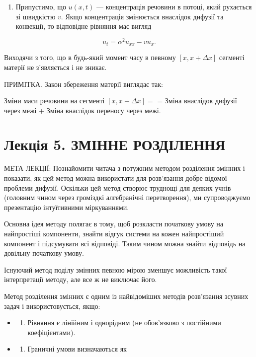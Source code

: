 \begin{enumerate}
\def\labelenumi{\arabic{enumi}.}
\setcounter{enumi}{3}
\tightlist
\item
  Припустимо, що \(u(x,t)\) --- концентрація речовини в потоці, який рухається зі швидкістю \(v\). Якщо концентрація змінюється внаслідок дифузії та конвекції, то відповідне рівняння має вигляд
\end{enumerate}

\[
u_t = \alpha^2 u_{xx} - v u_x.
\]

Виходячи з того, що в будь-який момент часу в певному \([x, x + \Delta x]\) сегменті матерії не з'являється і не зникає.

ПРИМІТКА. Закон збереження матерії виглядає так:

Зміни маси речовини на сегменті \([x, x + \Delta x] =\) = Зміна внаслідок дифузії через межі + Зміна внаслідок переносу через межі.

\section{Лекція 5. ЗМІННЕ РОЗДІЛЕННЯ}\label{ux43bux435ux43aux446ux456ux44f-5.-ux437ux43cux456ux43dux43dux435-ux440ux43eux437ux434ux456ux43bux435ux43dux43dux44f}

МЕТА ЛЕКЦІЇ: Познайомити читача з потужним методом розділення змінних і показати, як цей метод можна використати для розв'язання добре відомої проблеми дифузії. Оскільки цей метод створює труднощі для деяких учнів (головним чином через громіздкі алгебранічні перетворення), ми супроводжуємо презентацію інтуїтивними міркуваннями.

Основна ідея методу полягає в тому, щоб розкласти початкову умову на найпростіші компоненти, знайти відгук системи на кожен найпростіший компонент і підсумувати всі відповіді. Таким чином можна знайти відповідь на довільну початкову умову.

Існуючий метод поділу змінних певною мірою зменшує можливість такої інтерпретації методу, але все ж не виключає його.

Метод розділення змінних є одним із найвідоміших методів розв'язання зсувних задач і використовується, якщо:

\begin{itemize}
\tightlist
\item
  \begin{enumerate}
  \def\labelenumi{\arabic{enumi}.}
  \tightlist
  \item
    Рівняння є лінійним і однорідним (не обов'язково з постійними коефіцієнтами).
  \end{enumerate}
\item
  \begin{enumerate}
  \def\labelenumi{\arabic{enumi}.}
  \setcounter{enumi}{1}
  \tightlist
  \item
    Граничні умови визначаються як
  \end{enumerate}
\end{itemize}

